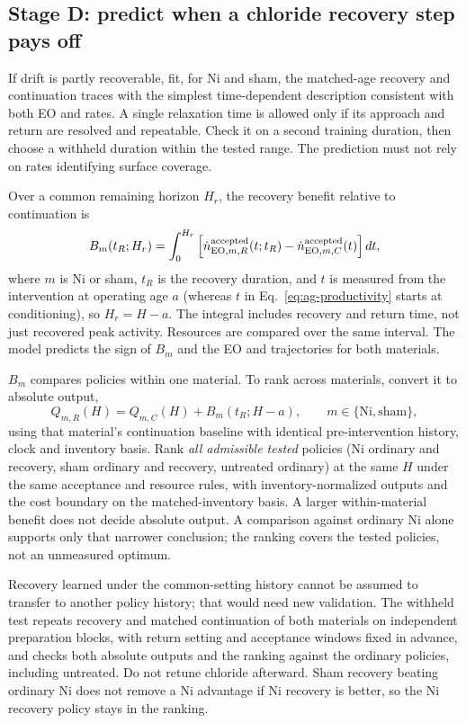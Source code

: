 \subsection{Stage D: predict when a chloride recovery step pays off}

If drift is partly recoverable, fit, for Ni and sham, the matched-age recovery and continuation traces with the simplest time-dependent description consistent with both EO and \COtwo{} rates. A single relaxation time is allowed only if its approach and return are resolved and repeatable. Check it on a second training duration, then choose a withheld duration within the tested range. The prediction must not rely on rates identifying surface coverage.

Over a common remaining horizon $H_r$, the recovery benefit relative to continuation is
\begin{equation}
 B_m(t_R;H_r)=\int_0^{H_r}
 \left[\dot n_{{\rm EO},m,R}^{\rm accepted}(t;t_R)
 -\dot n_{{\rm EO},m,C}^{\rm accepted}(t)\right]dt,
 \label{eq:ag-recovery-benefit}
\end{equation}
where $m$ is Ni or sham, $t_R$ is the recovery duration, and $t$ is measured from the intervention at operating age $a$ (whereas $t$ in Eq.~\eqref{eq:ag-productivity} starts at conditioning), so $H_r=H-a$. The integral includes recovery and return time, not just recovered peak activity. Resources are compared over the same interval. The model predicts the sign of $B_m$ and the EO and \COtwo{} trajectories for both materials.

$B_m$ compares policies within one material. To rank across materials, convert it to absolute output,
\begin{equation}
 Q_{m,R}(H)=Q_{m,C}(H)+B_m(t_R;H-a),
 \qquad m\in\{\mathrm{Ni},\mathrm{sham}\},
 \label{eq:ag-absolute-recovery}
\end{equation}
using that material's continuation baseline with identical pre-intervention history, clock and inventory basis. Rank \emph{all admissible tested} policies (Ni ordinary and recovery, sham ordinary and recovery, untreated ordinary) at the same $H$ under the same acceptance and resource rules, with inventory-normalized outputs and the cost boundary on the matched-inventory basis. A larger within-material benefit does not decide absolute output. A comparison against ordinary Ni alone supports only that narrower conclusion; the ranking covers the tested policies, not an unmeasured optimum.

Recovery learned under the common-setting history cannot be assumed to transfer to another policy history; that would need new validation. The withheld test repeats recovery and matched continuation of both materials on independent preparation blocks, with return setting and acceptance windows fixed in advance, and checks both absolute outputs and the ranking against the ordinary policies, including untreated. Do not retune chloride afterward. Sham recovery beating ordinary Ni does not remove a Ni advantage if Ni recovery is better, so the Ni recovery policy stays in the ranking.

